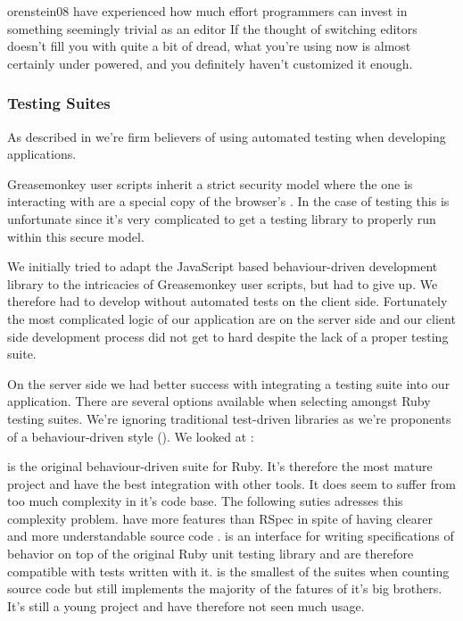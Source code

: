 \begin{fullquote}{orenstein08}{%
  have experienced how much effort programmers can
  invest in something seemingly trivial as an editor}
    If the thought of switching editors doesn't fill you with quite a bit of
    dread, what you're using now is almost certainly under powered, and you
    definitely haven't customized it enough.
\end{fullquote}

\subsubsection{Testing Suites}

As described in  we're firm
believers of using automated testing when developing applications.

Greasemonkey user scripts inherit a strict security model where the
 one is interacting with are a special copy of the browser's
. In the case of testing this is unfortunate since it's very
complicated to get a testing library to properly run within this secure model.

We initially tried to adapt the %
JavaScript based behaviour-driven development library to the intricacies of
Greasemonkey user scripts, but had to give up. We therefore had to develop
without automated tests on the client side.
Fortunately the most complicated logic of our application are on the server
side and our client side development process did not get to hard despite the
lack of a proper testing suite.

On the server side we had better success with integrating a testing suite into
our application. There are several options available when selecting amongst
Ruby testing suites. We're ignoring traditional test-driven libraries as
we're proponents of a behaviour-driven style
(). We looked at%
:

\begin{items}
   is the original behaviour-driven suite for Ruby. It's
    therefore the most mature project and have the best integration with
    other tools. It does seem to suffer from too much complexity in it's code
    base. The following suties adresses this complexity problem.
   have more features than RSpec in spite of having clearer
    and more understandable source code \citep{klishin08}.
   is an interface for writing specifications of behavior
    on top of the original Ruby unit testing library and are therefore
    compatible with tests written with it.
   is the smallest of the suites when counting source code
    but still implements the majority of the fatures of it's big brothers.
    It's still a young project and have therefore not seen much usage.
\end{items}

